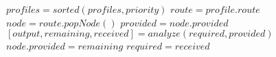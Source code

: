 \documentclass{standalone}
\begin{document}
\begin{varwidth}{\linewidth}
\par\noindent
 \begin{algorithmic}[1]
   \State $profiles = sorted(profiles,priority)$
   \State $route = profile.route$
   \State $node = route.popNode()$
   \State $provided = node.provided$
   \State $[output, remaining, received] = analyze(required, provided)$
   \State $node.provided = remaining$
   \State $required = received$
   \EndWhile
   \EndFor
   \EndProcedure
 \end{algorithmic}
\end{varwidth}
\end{document}
